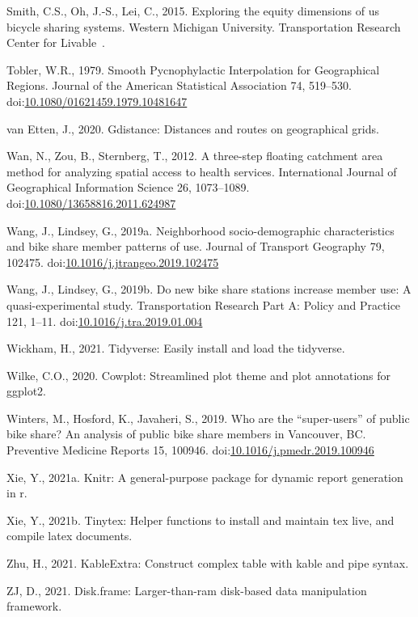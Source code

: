 \documentclass[]{elsarticle} %
\begin{document}
\leavevmode\hypertarget{ref-smith2015exploring}{}%
Smith, C.S., Oh, J.-S., Lei, C., 2015. Exploring the equity dimensions
of us bicycle sharing systems. Western Michigan University.
Transportation Research Center for Livable~.

\leavevmode\hypertarget{ref-toblerSmoothPycnophylacticInterpolation1979}{}%
Tobler, W.R., 1979. Smooth Pycnophylactic Interpolation for Geographical
Regions. Journal of the American Statistical Association 74, 519--530.
doi:\href{https://doi.org/10.1080/01621459.1979.10481647}{10.1080/01621459.1979.10481647}

\leavevmode\hypertarget{ref-R-gdistance}{}%
van Etten, J., 2020. Gdistance: Distances and routes on geographical
grids.

\leavevmode\hypertarget{ref-wanThreestepFloatingCatchment2012}{}%
Wan, N., Zou, B., Sternberg, T., 2012. A three-step floating catchment
area method for analyzing spatial access to health services.
International Journal of Geographical Information Science 26,
1073--1089.
doi:\href{https://doi.org/10.1080/13658816.2011.624987}{10.1080/13658816.2011.624987}

\leavevmode\hypertarget{ref-wangNeighborhoodSociodemographicCharacteristics2019}{}%
Wang, J., Lindsey, G., 2019a. Neighborhood socio-demographic
characteristics and bike share member patterns of use. Journal of
Transport Geography 79, 102475.
doi:\href{https://doi.org/10.1016/j.jtrangeo.2019.102475}{10.1016/j.jtrangeo.2019.102475}

\leavevmode\hypertarget{ref-wangNewBikeShare2019}{}%
Wang, J., Lindsey, G., 2019b. Do new bike share stations increase member
use: A quasi-experimental study. Transportation Research Part A: Policy
and Practice 121, 1--11.
doi:\href{https://doi.org/10.1016/j.tra.2019.01.004}{10.1016/j.tra.2019.01.004}

\leavevmode\hypertarget{ref-R-tidyverse}{}%
Wickham, H., 2021. Tidyverse: Easily install and load the tidyverse.

\leavevmode\hypertarget{ref-R-cowplot}{}%
Wilke, C.O., 2020. Cowplot: Streamlined plot theme and plot annotations
for ggplot2.

\leavevmode\hypertarget{ref-wintersWhoAreSuperusers2019}{}%
Winters, M., Hosford, K., Javaheri, S., 2019. Who are the
``super-users'' of public bike share? An analysis of public bike share
members in Vancouver, BC. Preventive Medicine Reports 15, 100946.
doi:\href{https://doi.org/10.1016/j.pmedr.2019.100946}{10.1016/j.pmedr.2019.100946}

\leavevmode\hypertarget{ref-R-knitr}{}%
Xie, Y., 2021a. Knitr: A general-purpose package for dynamic report
generation in r.

\leavevmode\hypertarget{ref-R-tinytex}{}%
Xie, Y., 2021b. Tinytex: Helper functions to install and maintain tex
live, and compile latex documents.

\leavevmode\hypertarget{ref-R-kableExtra}{}%
Zhu, H., 2021. KableExtra: Construct complex table with kable and pipe
syntax.

\leavevmode\hypertarget{ref-R-disk.frame}{}%
ZJ, D., 2021. Disk.frame: Larger-than-ram disk-based data manipulation
framework.
\end{document}
